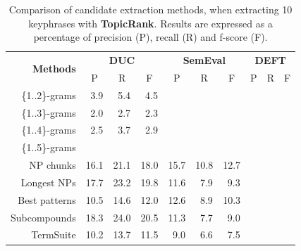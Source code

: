     \begin{table}[h]
      \centering
      \begin{tabular}{rccccccccc}
        \toprule
        \multirow{2}{*}[-2pt]{\textbf{Methods}} & \multicolumn{3}{c}{\textbf{DUC}} & \multicolumn{3}{c}{\textbf{SemEval}} & \multicolumn{3}{c}{\textbf{DEFT}}\\
        \cmidrule(r){2-4}\cmidrule(lr){5-7}\cmidrule(l){8-10}
        & P & R & F & P & R & F & P & R & F\\
        \midrule
        \{1..2\}-grams & $~~$3.9 & $~~$5.4 & $~~$4.5 & & & & & &\\
        \{1..3\}-grams & $~~$2.0 & $~~$2.7 & $~~$2.3 & & & & & &\\
        \{1..4\}-grams & $~~$2.5 & $~~$3.7 & $~~$2.9 & & & & & &\\
        \{1..5\}-grams & & & & & & & & &\\
        NP chunks & 16.1 & 21.1 & 18.0 & 15.7 & 10.8 & 12.7 & & &\\
        Longest NPs & 17.7 & 23.2 & 19.8 & 11.6 & $~~$7.9 & $~~$9.3 & & &\\
        Best patterns & 10.5 & 14.6 & 12.0 & 12.6 & $~~$8.9 & 10.3 & & &\\
        Subcompounds & 18.3 & 24.0 & 20.5 & 11.3 & $~~$7.7 & $~~$9.0 & & &\\
        TermSuite & 10.2 & 13.7 & 11.5 & $~~$9.0 & $~~$6.6 & $~~$7.5 & & &\\
        \bottomrule
      \end{tabular}
      \caption{Comparison of candidate extraction methods, when extracting 10
               keyphrases with \textbf{TopicRank}. Results are expressed as a
               percentage of precision (P), recall (R) and f-score (F).
               \label{tab:keyphrase_extraction_results}}
    \end{table}

